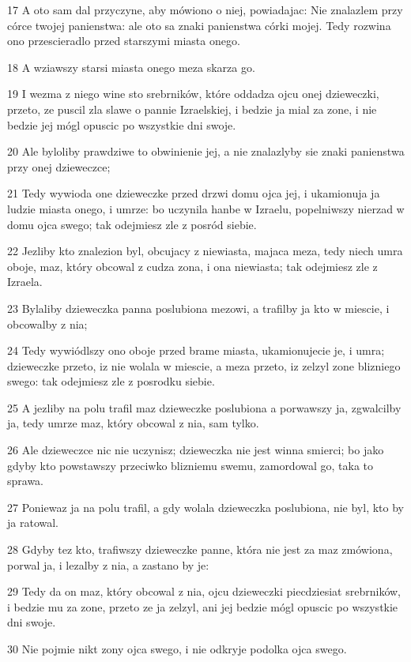 \par 17 A oto sam dal przyczyne, aby mówiono o niej, powiadajac: Nie znalazlem przy córce twojej panienstwa: ale oto sa znaki panienstwa córki mojej. Tedy rozwina ono przescieradlo przed starszymi miasta onego.
\par 18 A wziawszy starsi miasta onego meza skarza go.
\par 19 I wezma z niego wine sto srebrników, które oddadza ojcu onej dzieweczki, przeto, ze puscil zla slawe o pannie Izraelskiej, i bedzie ja mial za zone, i nie bedzie jej mógl opuscic po wszystkie dni swoje.
\par 20 Ale byloliby prawdziwe to obwinienie jej, a nie znalazlyby sie znaki panienstwa przy onej dzieweczce;
\par 21 Tedy wywioda one dzieweczke przed drzwi domu ojca jej, i ukamionuja ja ludzie miasta onego, i umrze: bo uczynila hanbe w Izraelu, popelniwszy nierzad w domu ojca swego; tak odejmiesz zle z posród siebie.
\par 22 Jezliby kto znalezion byl, obcujacy z niewiasta, majaca meza, tedy niech umra oboje, maz, który obcowal z cudza zona, i ona niewiasta; tak odejmiesz zle z Izraela.
\par 23 Bylaliby dzieweczka panna poslubiona mezowi, a trafilby ja kto w miescie, i obcowalby z nia;
\par 24 Tedy wywiódlszy ono oboje przed brame miasta, ukamionujecie je, i umra; dzieweczke przeto, iz nie wolala w miescie, a meza przeto, iz zelzyl zone blizniego swego: tak odejmiesz zle z posrodku siebie.
\par 25 A jezliby na polu trafil maz dzieweczke poslubiona a porwawszy ja, zgwalcilby ja, tedy umrze maz, który obcowal z nia, sam tylko.
\par 26 Ale dzieweczce nic nie uczynisz; dzieweczka nie jest winna smierci; bo jako gdyby kto powstawszy przeciwko blizniemu swemu, zamordowal go, taka to sprawa.
\par 27 Poniewaz ja na polu trafil, a gdy wolala dzieweczka poslubiona, nie byl, kto by ja ratowal.
\par 28 Gdyby tez kto, trafiwszy dzieweczke panne, która nie jest za maz zmówiona, porwal ja, i lezalby z nia, a zastano by je:
\par 29 Tedy da on maz, który obcowal z nia, ojcu dzieweczki piecdziesiat srebrników, i bedzie mu za zone, przeto ze ja zelzyl, ani jej bedzie mógl opuscic po wszystkie dni swoje.
\par 30 Nie pojmie nikt zony ojca swego, i nie odkryje podolka ojca swego.

